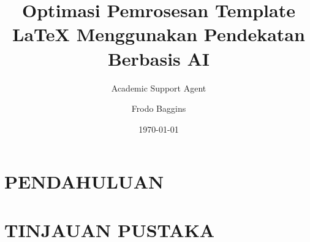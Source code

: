 \documentclass{clean_cv}
\title{Optimasi Pemrosesan Template LaTeX Menggunakan Pendekatan Berbasis AI}
\author{Academic Support Agent}
\date{\today}
\begin{document}
\maketitle

\begin{abstract}

\end{abstract}

\chapter{PENDAHULUAN}


\chapter{TINJAUAN PUSTAKA}





\author{Frodo Baggins}
\end{document}
